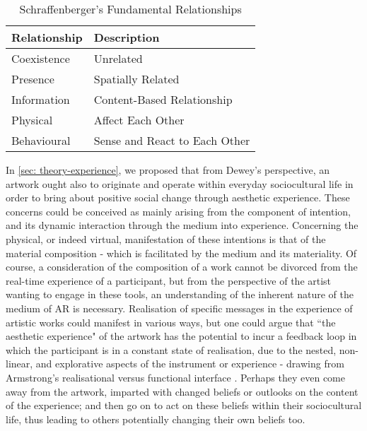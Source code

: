 \begin{table}
    \centering
    \begin{tabular}{ l l }
        \toprule
        Relationship        & Description                       \\
        \midrule
        Coexistence         & Unrelated                         \\
        Presence            & Spatially Related                 \\
        Information         & Content-Based Relationship        \\
        Physical            & Affect Each Other                 \\
        Behavioural         & Sense and React to Each Other     \\
        \bottomrule
    \end{tabular}
    \caption{Schraffenberger's Fundamental Relationships}\label{table:schraffenbergertaxonomy2}
\end{table}
In \autoref{sec: theory-experience}, we proposed that from Dewey's perspective, an artwork ought also to originate and operate within everyday sociocultural life in order to bring about positive social change through aesthetic experience. These concerns could be conceived as mainly arising from the component of intention, and its dynamic interaction through the medium into experience. Concerning the physical, or indeed virtual, manifestation of these intentions is that of the material composition - which is facilitated by the medium and its materiality. Of course, a consideration of the composition of a work cannot be divorced from the real-time experience of a participant, but from the perspective of the artist wanting to engage in these tools, an understanding of the inherent nature of the medium of AR is necessary.  Realisation of specific messages in the experience of artistic works could manifest in various ways, but one could argue that ``the aesthetic experience" of the artwork has the potential to incur a feedback loop in which the participant is in a constant state of realisation, due to the nested, non-linear, and explorative aspects of the instrument or experience - drawing from Armstrong's realisational versus functional interface \citeyearpar{armstrong2006}. Perhaps they even come away from the artwork, imparted with changed beliefs or outlooks on the content of the experience; and then go on to act on these beliefs within their sociocultural life, thus leading to others potentially changing their own beliefs too.

